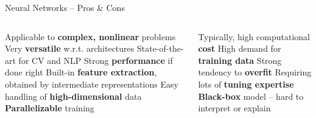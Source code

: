 \begin{frame}{Neural Networks -- Pros \& Cons}

\footnotesize

\begin{columns}[onlytextwidth]
  \begin{column}{0.5\textwidth}
    \footnotesize
    \begin{itemize}
      \positem Applicable to \textbf{complex, nonlinear} problems
      \positem Very \textbf{versatile} w.r.t. architectures
      \positem State-of-the-art for CV and NLP
      \positem Strong \textbf{performance} if done right
      \positem Built-in \textbf{feature extraction}, obtained by intermediate
      representations
      \positem Easy handling of \textbf{high-dimensional} data
      \positem \textbf{Parallelizable} training 
    \end{itemize}
  \end{column}

  \begin{column}{0.5\textwidth}
    \footnotesize
    \begin{itemize}
      \negitem Typically, high computational \textbf{cost}
      \negitem High demand for \textbf{training data} 
      \negitem Strong tendency to \textbf{overfit}
      \negitem Requiring lots of \textbf{tuning expertise} 
      \negitem \textbf{Black-box} model -- hard to interpret or explain
    \end{itemize}
  \end{column}
\end{columns}

\vfill

\small


\end{frame}